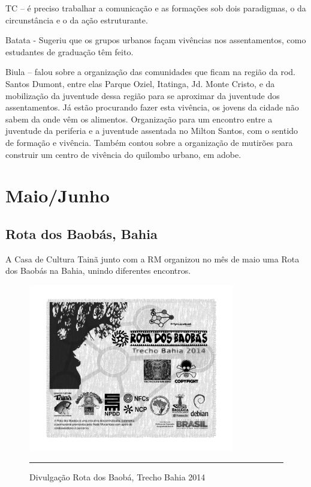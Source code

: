 \documentclass[a4paper, 11pt, oneside]{Relatorio_sem_2}  %
\begin{document}
TC – é preciso trabalhar a comunicação e as formações sob dois
paradigmas, o da circunstância e o da ação estruturante.

Batata - Sugeriu que os grupos urbanos façam vivências nos
assentamentos, como estudantes de graduação têm feito.

Biula – falou sobre a organização das comunidades que ficam na região
da rod. Santos Dumont, entre elas Parque Oziel, Itatinga, Jd. Monte
Cristo, e da mobilização da juventude dessa região para se aproximar
da juventude dos assentamentos. Já estão procurando fazer esta
vivência, os jovens da cidade não sabem da onde vêm os
alimentos. Organização para um encontro entre a juventude da periferia
e a juventude assentada no Milton Santos, com o sentido de formação e
vivência. Também contou sobre a organização de mutirões para construir
um centro de vivência do quilombo urbano, em adobe.





\part{Maio/Junho} %


\chapter{Rota dos Baobás, Bahia}

A Casa de Cultura Tainã junto com a RM organizou no mês de maio uma
Rota dos Baobás na Bahia, unindo diferentes encontros.

\begin{figure}[htbp]
  \centering
  \includegraphics[width=0.8\textwidth]{./Fig/RotaBahia.pdf}
  \rule{35em}{0.5pt}
  \caption[Divulgação Rota dos Baobá, Trecho Bahia 2014]{Divulgação Rota dos Baobá, Trecho Bahia 2014}
  \label{fig:RotaBahia}
\end{figure}
\end{document}
